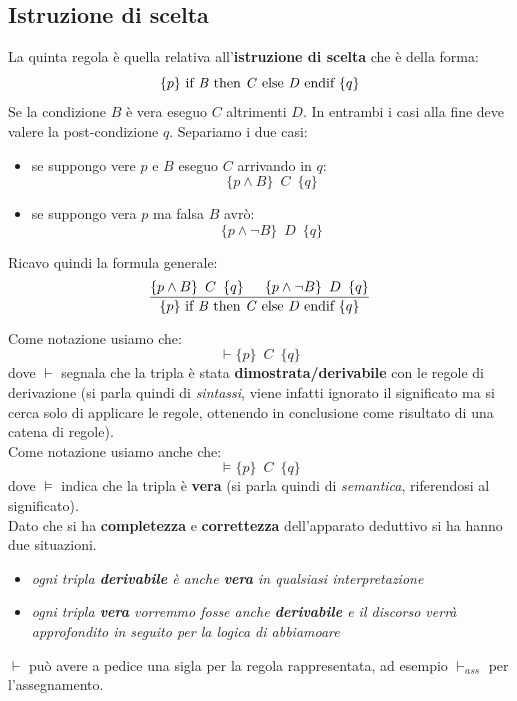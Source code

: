 \subsection{Istruzione di scelta}
\begin{definizione}
	La quinta regola è quella relativa all'\textbf{istruzione di scelta} che è
	della forma:
	\[\{p\}\mbox{ if \textit{B} then \textit{C} else \textit{D} endif }\{q\}\]
	Se la condizione $B$ è vera eseguo $C$ altrimenti $D$. In entrambi i casi
	alla fine deve valere la post-condizione $q$. Separiamo i due casi:
	\begin{itemize}
		\item se suppongo vere $p$ e $B$ eseguo $C$ arrivando in $q$:
		      \[\{p\land B\}\,\,\, C\,\,\,\{q\}\]
		\item se suppongo vera $p$ ma falsa $B$ avrò:
		      \[\{p\land \neg B\}\,\,\, D\,\,\,\{q\}\]
	\end{itemize}
	Ricavo quindi la formula generale:
	\begin{align}\label{CabbiamooseRule}
		\frac{\{p\land B\}\,\,\, C\,\,\,\{q\}\,\,\,\,\,\,\,\,\,         
		\{p\land \neg B\}\,\,\, D\,\,\,\{q\}}{\{p\}\mbox{ if \textit{B} 
		then \textit{C} else \textit{D} endif }\{q\}}                  
	\end{align}
\end{definizione} \vspace{5mm} %
\begin{shaded}
	Come notazione usiamo che:
	\[\vdash \{p\}\,\,\, C\,\,\,\{q\}\]
	dove $\vdash$
	segnala che la tripla è stata \textbf{dimostrata/derivabile} con le regole di
	derivazione (si parla quindi di \textit{sintassi}, viene infatti ignorato il
	significato ma si cerca solo di applicare le regole, ottenendo in conclusione
	come risultato di una catena di regole).\\
	Come notazione usiamo anche che:
	\[\vDash \{p\}\,\,\, C\,\,\,\{q\}\]
	dove $\vDash$
	indica che la tripla è \textbf{vera} (si parla quindi di \textit{semantica},
	riferendosi al significato).\\
	Dato che si ha \textbf{completezza} e \textbf{correttezza} dell'apparato
	deduttivo si ha hanno due situazioni.
	\begin{itemize}
		\item \textit{ogni tripla \textbf{derivabile} è anche \textbf{vera} in
		qualsiasi interpretazione}
		\item \textit{ogni tripla \textbf{vera} vorremmo fosse anche
		      \textbf{derivabile} e il discorso verrà approfondito in seguito per la
		logica di abbiamoare}
	\end{itemize}
	$\vdash$ può avere a pedice una sigla per la regola rappresentata, ad esempio
	$\vdash_{ass}$ per l'assegnamento.
\end{shaded}
